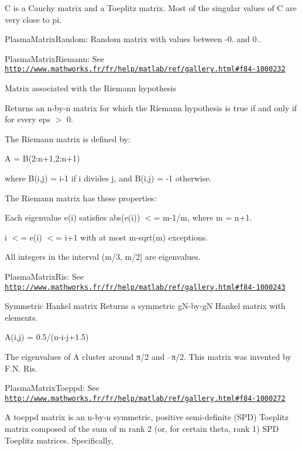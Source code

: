 C is a Cauchy matrix and a Toeplitz matrix. Most of the singular values of C are very close to pi.

\begin{DoxyItemize}
\item Plasma\+Matrix\+Random\+: Random matrix with values between -\/0. and 0..\end{DoxyItemize}
\begin{DoxyItemize}
\item Plasma\+Matrix\+Riemann\+: See \href{http://www.mathworks.fr/fr/help/matlab/ref/gallery.html#f84-1000232}{\tt http\+://www.\+mathworks.\+fr/fr/help/matlab/ref/gallery.\+html\#f84-\/1000232}\end{DoxyItemize}
Matrix associated with the Riemann hypothesis

Returns an n-\/by-\/n matrix for which the Riemann hypothesis is true if and only if for every eps $>$ 0.

The Riemann matrix is defined by\+:

A = B(2\+:n+1,2\+:n+1)

where B(i,j) = i-\/1 if i divides j, and B(i,j) = -\/1 otherwise.

The Riemann matrix has these properties\+:
\begin{DoxyItemize}
\item Each eigenvalue e(i) satisfies abs(e(i)) $<$= m-\/1/m, where m = n+1.
\item i $<$= e(i) $<$= i+1 with at most m-\/sqrt(m) exceptions.
\item All integers in the interval (m/3, m/2\mbox{]} are eigenvalues.
\end{DoxyItemize}

\begin{DoxyItemize}
\item Plasma\+Matrix\+Ris\+: See \href{http://www.mathworks.fr/fr/help/matlab/ref/gallery.html#f84-1000243}{\tt http\+://www.\+mathworks.\+fr/fr/help/matlab/ref/gallery.\+html\#f84-\/1000243}\end{DoxyItemize}
Symmetric Hankel matrix Returns a symmetric g\+N-\/by-\/g\+N Hankel matrix with elements. \begin{DoxyVerb}A(i,j) = 0.5/(n-i-j+1.5)
\end{DoxyVerb}


The eigenvalues of A cluster around π/2 and –π/2. This matrix was invented by F.\+N. Ris.

\begin{DoxyItemize}
\item Plasma\+Matrix\+Toeppd\+: See \href{http://www.mathworks.fr/fr/help/matlab/ref/gallery.html#f84-1000272}{\tt http\+://www.\+mathworks.\+fr/fr/help/matlab/ref/gallery.\+html\#f84-\/1000272}\end{DoxyItemize}
A toeppd matrix is an n-\/by-\/n symmetric, positive semi-\/definite (S\+P\+D) Toeplitz matrix composed of the sum of m rank 2 (or, for certain theta, rank 1) S\+P\+D Toeplitz matrices. Specifically,

